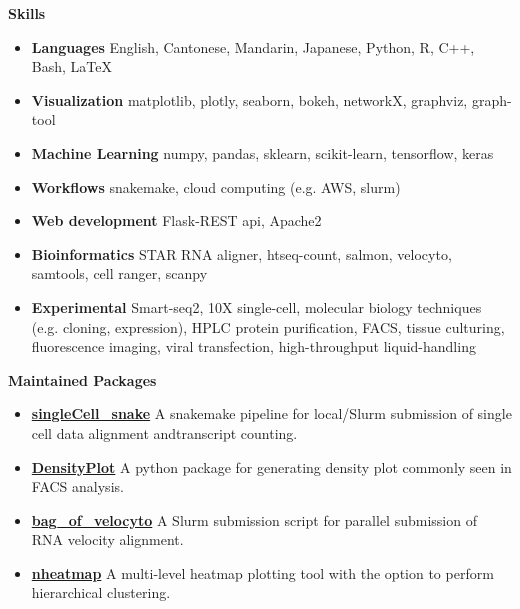 \documentclass[letterpaper,12pt]{article}[leftmargin=*]
\def \entryspacing {-0pt}
\renewcommand{\section}[2]{\vspace{5pt}
  \colorbox{secondary}{\color{white}\raggedbottom\normalsize\textbf{{#1}{\hspace{7pt}#2}}}
}
\newcommand{\resumeEntryStart}{\begin{itemize}[leftmargin=2.5mm]}
\newcommand{\resumeEntryEnd}{\end{itemize}\vspace{\entryspacing}}
\newcommand{\resumeEntryS}[2]{
  \item[]\small{
    \textbf{\color{primary}#1 }{ #2 \vspace{-6pt}}
  }
}
\begin{document}
\section{\faBarChart}{Skills}
 \resumeEntryStart
  \resumeEntryS{Languages } {English, Cantonese, Mandarin, Japanese, Python, R, C++, Bash, \LaTeX}
  \resumeEntryS{Visualization } {matplotlib, plotly, seaborn, bokeh, networkX, graphviz, graph-tool}
  \resumeEntryS{Machine Learning } {numpy, pandas, sklearn, scikit-learn, tensorflow, keras}
  \resumeEntryS{Workflows } {snakemake, cloud computing (e.g. AWS, slurm)}
  \resumeEntryS{Web development } {Flask-REST api, Apache2}
  \resumeEntryS{Bioinformatics } {STAR RNA aligner, htseq-count, salmon, velocyto, samtools, cell ranger, scanpy}
  \resumeEntryS{Experimental } {Smart-seq2, 10X single-cell, molecular biology techniques (e.g. cloning, expression), HPLC protein purification, FACS, tissue culturing, fluorescence imaging, viral transfection, high-throughput liquid-handling}
 \resumeEntryEnd

\section{\faGithub}{Maintained Packages}
 \resumeEntryStart
  \resumeEntryS{\href{https://github.com/xuesoso/singleCell\_snake}{singleCell\_snake} } {A snakemake pipeline for local/Slurm submission of single cell data alignment andtranscript counting.}
  \resumeEntryS{\href{https://github.com/xuesoso/DensityPlot}{DensityPlot} } {A python package for generating density plot commonly seen in FACS analysis.}
  \resumeEntryS{\href{https://github.com/xuesoso/bag\_of\_velocyto}{bag\_of\_velocyto} } {A Slurm submission script for parallel submission of RNA velocity alignment.}
  \resumeEntryS{\href{https://github.com/xuesoso/nheatmap}{nheatmap} } {A multi-level heatmap plotting tool with the option to perform hierarchical clustering.}
 \resumeEntryEnd
\end{document}
